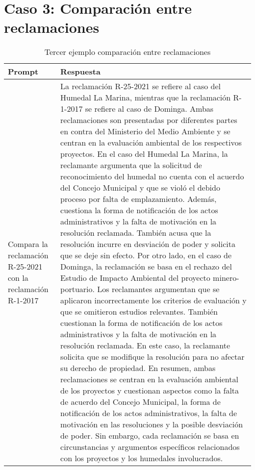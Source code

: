 \newpage

\section{Caso 3: Comparación entre reclamaciones}

\begin{table}[ht!]
    \centering
    \caption[Ejemplo: Tercero Prompt]{Tercer ejemplo comparación entre reclamaciones}
    \begin{tabular}{p{3cm}p{12cm}}
        \toprule
        \textbf{Prompt} & \textbf{Respuesta} \\
        \hline\hline
        Compara la reclamación R-25-2021 con la reclamación R-1-2017& La reclamación R-25-2021 se refiere al caso del Humedal La Marina, mientras que la reclamación R-1-2017 se refiere al caso de Dominga. Ambas reclamaciones son presentadas por diferentes partes en contra del Ministerio del Medio Ambiente y se centran en la evaluación ambiental de los respectivos proyectos. En el caso del Humedal La Marina, la reclamante argumenta que la solicitud de reconocimiento del humedal no cuenta con el acuerdo del Concejo Municipal y que se violó el debido proceso por falta de emplazamiento. Además, cuestiona la forma de notificación de los actos administrativos y la falta de motivación en la resolución reclamada. También acusa que la resolución incurre en desviación de poder y solicita que se deje sin efecto. Por otro lado, en el caso de Dominga, la reclamación se basa en el rechazo del Estudio de Impacto Ambiental del proyecto minero-portuario. Los reclamantes argumentan que se aplicaron incorrectamente los criterios de evaluación y que se omitieron estudios relevantes. También cuestionan la forma de notificación de los actos administrativos y la falta de motivación en la resolución reclamada. En este caso, la reclamante solicita que se modifique la resolución para no afectar su derecho de propiedad. En resumen, ambas reclamaciones se centran en la evaluación ambiental de los proyectos y cuestionan aspectos como la falta de acuerdo del Concejo Municipal, la forma de notificación de los actos administrativos, la falta de motivación en las resoluciones y la posible desviación de poder. Sin embargo, cada reclamación se basa en circunstancias y argumentos específicos relacionados con los proyectos y los humedales involucrados.\\
        \bottomrule
    \end{tabular}
    \label{tb1:prompt1}
\end{table}

